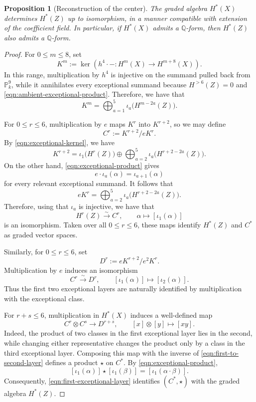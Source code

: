 \documentclass[11pt, reqno]{amsart}
\newtheorem{proposition}[theorem]{Proposition}
\theoremstyle{definition}
\newcommand\QQ{\mathbb{Q}}
\newcommand\PP{\mathbb{P}}
\begin{document}
\begin{proposition}[Reconstruction of the center]
\label{prop:recovering-Z-from-X}
The graded algebra $H^*(X)$ determines $H^*(Z)$ up to isomorphism, in
a manner compatible with extension of the coefficient field.  In
particular, if $H^*(X)$ admits a $\QQ$-form, then $H^*(Z)$ also admits
a $\QQ$-form.
\end{proposition}

\begin{proof}
For $0\leq m\leq 8$, set
\[
K^m
:=
\ker\left(
h^4\cdot-:
H^m(X)\longrightarrow H^{m+8}(X)
\right).
\]
In this range, multiplication by $h^4$ is injective on the summand
pulled back from $\PP^9_k$, while it annihilates every exceptional
summand because $H^{>6}(Z)=0$ and \eqref{eqn:ambient-exceptional-product}.  
Therefore, we have that
\begin{equation}
\label{eqn:exceptional-kernel}
K^m
=
\bigoplus_{a=1}^{5}
\iota_a\bigl(H^{m-2a}(Z)\bigr).
\end{equation}

For $0\leq r\leq 6$, multiplication by $e$ maps $K^r$ into
$K^{r+2}$, so we may define
\[
C^r:=K^{r+2}/eK^r.
\]
By \eqref{eqn:exceptional-kernel}, we have
\[
K^{r+2}
=
\iota_1\bigl(H^r(Z)\bigr)
\oplus
\bigoplus_{a=2}^{5}
\iota_a\bigl(H^{r+2-2a}(Z)\bigr).
\]
On the other hand, \eqref{eqn:exceptional-product} gives
\[
e\cdot\iota_a(\alpha)=\iota_{a+1}(\alpha)
\]
for every relevant exceptional summand.  It follows that
\[
eK^r
=
\bigoplus_{a=2}^{5}
\iota_a\bigl(H^{r+2-2a}(Z)\bigr).
\]
Therefore, using that $\iota_a$ is injective, we have that
\begin{equation}
\label{eqn:first-exceptional-layer}
H^r(Z)\xrightarrow{\sim}C^r,
\qquad
\alpha\longmapsto[\iota_1(\alpha)]
\end{equation}
is an isomorphism.  Taken over all $0\leq r\leq6$, these maps identify
$H^*(Z)$ and $C^*$ as graded vector spaces.

Similarly, for $0\leq r\leq 6$, set
\[
D^r:=eK^{r+2}/e^2K^r.
\]
Multiplication by $e$ induces an isomorphism
\begin{equation}
\label{eqn:first-to-second-layer}
C^r\xrightarrow{\sim}D^r,
\qquad
[\iota_1(\alpha)]\longmapsto[\iota_2(\alpha)].
\end{equation}
Thus the first two exceptional layers are naturally identified by
multiplication with the exceptional class.

For $r+s\leq 6$, multiplication in $H^*(X)$ induces a well-defined map
\[
C^r\otimes C^s\longrightarrow D^{r+s},
\qquad
[x]\otimes[y]\longmapsto[xy].
\]
Indeed, the product of two classes in the first exceptional layer lies
in the second, while changing either representative changes the product
only by a class in the third exceptional layer.  Composing this map with
the inverse of \eqref{eqn:first-to-second-layer} defines a product
$\star$ on $C^*$.  By \eqref{eqn:exceptional-product},
\[
[\iota_1(\alpha)]\star[\iota_1(\beta)]
=
[\iota_1(\alpha\cdot\beta)].
\]
Consequently, \eqref{eqn:first-exceptional-layer} identifies
$(C^*,\star)$ with the graded algebra $H^*(Z)$.


\end{proof}
\end{document}
